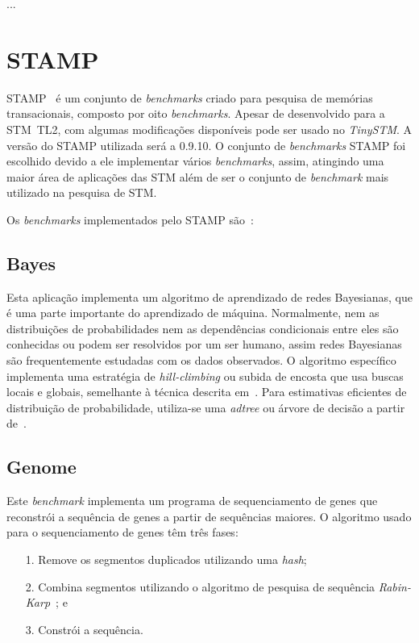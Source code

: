 \documentclass[diss,capa]{texufpel}
\begin{document}
...

\chapter{STAMP}
\label{chapter::benchmark}


STAMP~\cite{STAMP} é um conjunto de \emph{benchmarks} criado para pesquisa de memórias transacionais, composto por oito \emph{benchmarks}. Apesar de desenvolvido para a STM~TL2, com algumas modificações disponíveis pode ser usado no \emph{TinySTM}.  A versão do STAMP utilizada será a 0.9.10. O conjunto de \emph{benchmarks} STAMP foi escolhido devido a ele implementar vários \emph{benchmarks}, assim, atingindo uma maior área de aplicações das STM além de ser o conjunto de \emph{benchmark} mais utilizado na pesquisa de STM.


Os \emph{benchmarks} implementados pelo STAMP são~\cite{STAMP}:
\newline


\section{\textbf{Bayes}}

Esta aplicação implementa um algoritmo de aprendizado de redes Bayesianas, que é uma parte importante do aprendizado de máquina. Normalmente, nem as distribuições de probabilidades nem as dependências condicionais entre eles são conhecidas ou podem ser resolvidos por um ser humano, assim redes Bayesianas são frequentemente estudadas com os dados observados. O algoritmo específico implementa uma estratégia de \emph{hill-climbing} ou subida de encosta que usa buscas locais e globais, semelhante à técnica descrita em~\cite{bayesian}. Para estimativas eficientes de distribuição de probabilidade, utiliza-se uma \emph{adtree} ou árvore de decisão a partir de~\cite{Moore97}.


\section{\textbf{Genome}}

Este \emph{benchmark} implementa um programa de sequenciamento de genes que reconstrói a sequência de genes a partir de sequências maiores. O algoritmo usado para o sequenciamento de genes têm  três fases:

\begin{enumerate}
  \item [1.] Remove os segmentos duplicados utilizando uma \emph{hash};
  \item [2.] Combina segmentos utilizando o algoritmo de pesquisa de sequência \emph{Rabin-Karp}~\cite{Karp87}; e
  \item [3.] Constrói a sequência.
  \newline
\end{enumerate}
\end{document}

